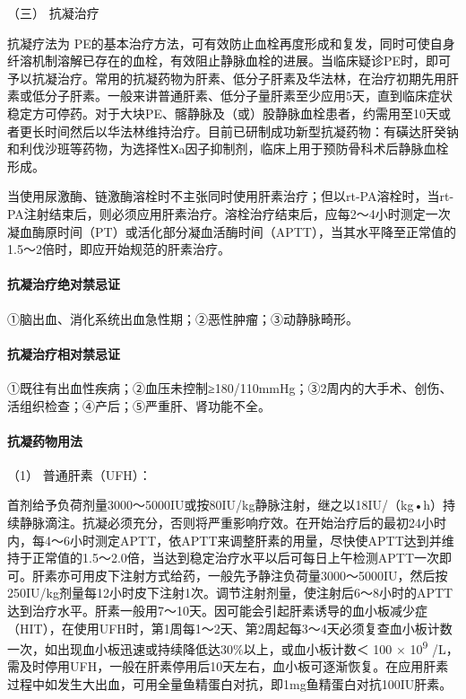 \hypertarget{text00278.htmlux5cux23CHP9-8-3-1-3}{}
（三） 抗凝治疗

抗凝疗法为
PE的基本治疗方法，可有效防止血栓再度形成和复发，同时可使自身纤溶机制溶解已存在的血栓，有效阻止静脉血栓的进展。当临床疑诊PE时，即可予以抗凝治疗。常用的抗凝药物为肝素、低分子肝素及华法林，在治疗初期先用肝素或低分子肝素。一般来讲普通肝素、低分子量肝素至少应用5天，直到临床症状稳定方可停药。对于大块PE、髂静脉及（或）股静脉血栓患者，约需用至10天或者更长时间然后以华法林维持治疗。目前已研制成功新型抗凝药物：有磺达肝癸钠和利伐沙班等药物，为选择性Ⅹa因子抑制剂，临床上用于预防骨科术后静脉血栓形成。

当使用尿激酶、链激酶溶栓时不主张同时使用肝素治疗；但以rt-PA溶栓时，当rt-PA注射结束后，则必须应用肝素治疗。溶栓治疗结束后，应每2～4小时测定一次凝血酶原时间（PT）或活化部分凝血活酶时间（APTT），当其水平降至正常值的1.5～2倍时，即应开始规范的肝素治疗。

\paragraph{抗凝治疗绝对禁忌证}

①脑出血、消化系统出血急性期；②恶性肿瘤；③动静脉畸形。

\paragraph{抗凝治疗相对禁忌证}

①既往有出血性疾病；②血压未控制≥180/110mmHg；③2周内的大手术、创伤、活组织检查；④产后；⑤严重肝、肾功能不全。

\paragraph{抗凝药物用法}

\hypertarget{text00278.htmlux5cux23CHP9-8-3-1-3-3-1}{}
（1） 普通肝素（UFH）：

首剂给予负荷剂量3000～5000IU或按80IU/kg静脉注射，继之以18IU/（kg•h）持续静脉滴注。抗凝必须充分，否则将严重影响疗效。在开始治疗后的最初24小时内，每4～6小时测定APTT，依APTT来调整肝素的用量，尽快使APTT达到并维持于正常值的1.5～2.0倍，当达到稳定治疗水平以后可每日上午检测APTT一次即可。肝素亦可用皮下注射方式给药，一般先予静注负荷量3000～5000IU，然后按250IU/kg剂量每12小时皮下注射1次。调节注射剂量，使注射后6～8小时的APTT达到治疗水平。肝素一般用7～10天。因可能会引起肝素诱导的血小板减少症（HIT），在使用UFH时，第1周每1～2天、第2周起每3～4天必须复查血小板计数一次，如出现血小板迅速或持续降低达30\%以上，或血小板计数＜
100 × 10\textsuperscript{9}
/L，需及时停用UFH，一般在肝素停用后10天左右，血小板可逐渐恢复。在应用肝素过程中如发生大出血，可用全量鱼精蛋白对抗，即1mg鱼精蛋白对抗100IU肝素。

